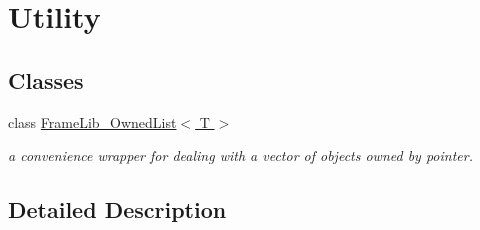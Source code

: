 \hypertarget{group___utility}{}\section{Utility}
\label{group___utility}
\subsection*{Classes}
\begin{DoxyCompactItemize}
\item 
class \hyperlink{struct_frame_lib___owned_list}{Frame\+Lib\+\_\+\+Owned\+List$<$ T $>$}
\begin{DoxyCompactList}\small\item\em a convenience wrapper for dealing with a vector of objects owned by pointer. \end{DoxyCompactList}\end{DoxyCompactItemize}


\subsection{Detailed Description}
